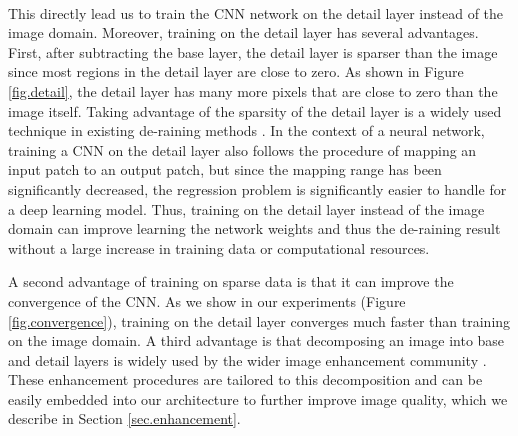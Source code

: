 \documentclass[journal]{IEEEtran}
\begin{document}
\begin{figure*}[tp!]
\begin{center}
\\
\caption{Sparsity of detail layer. The detail layers are obtained by  and .} \label{fig.detail}
\end{center}
\end{figure*}

This directly lead us to train the CNN network on the detail layer instead of the image domain. Moreover, training on the detail layer has several advantages. First, after subtracting the base layer, the detail layer is sparser than the image since most regions in the detail layer are close to zero. As shown in Figure \ref{fig.detail}, the detail layer has many more pixels that are close to zero than the image itself. Taking advantage of the sparsity of the detail layer is a widely used technique in existing de-raining methods \cite{12,13,16}. In the context of a neural network, training a CNN on the detail layer also follows the procedure of mapping an input patch to an output patch, but since the mapping range has been significantly decreased, the regression problem is significantly easier to handle for a deep learning model. Thus, training on the detail layer instead of the image domain can improve learning the network weights and thus the de-raining result without a large increase in training data or 
computational resources.

A second advantage of training on sparse data is that it can improve the convergence of the CNN. As we show in our experiments (Figure \ref{fig.convergence}), training on the detail layer converges much faster than training on the image domain. A third advantage is that decomposing an image into base and detail layers is widely used by the wider image enhancement community \cite{Gu2013HDR,Qiu2013LLSURE}. These enhancement procedures are tailored to this decomposition and can be easily embedded into our architecture to further improve image quality, which we describe in Section \ref{sec.enhancement}.
\end{document}

